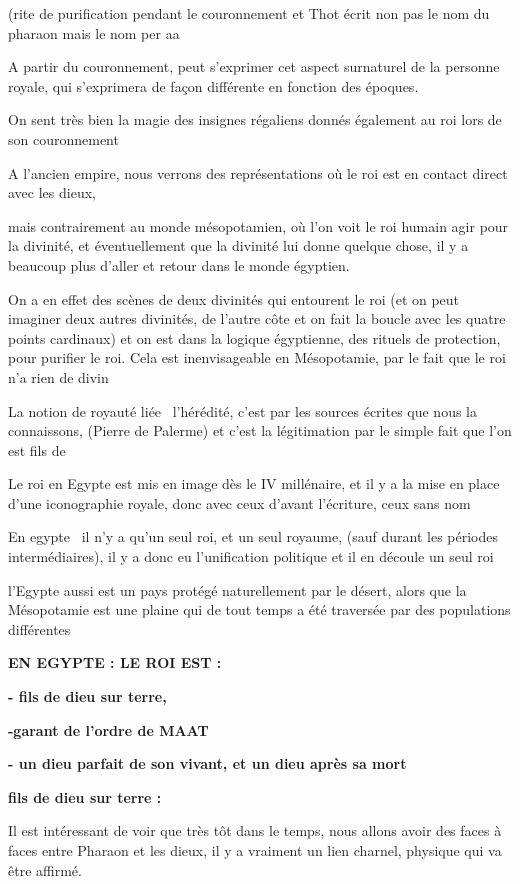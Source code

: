 \documentclass[a4paper]{article}
\begin{document}
(rite de purification pendant le couronnement et Thot écrit non pas le nom du pharaon mais le nom per aa


A partir du couronnement, peut s'exprimer cet aspect surnaturel de la personne royale, qui s'exprimera de façon
différente en fonction des époques. 


On sent très bien la magie des insignes régaliens donnés également au roi lors de son couronnement


A l'ancien empire, nous verrons des représentations où le roi est en contact direct avec les dieux, 

mais contrairement au monde mésopotamien, où l'on voit le roi humain agir pour la divinité, et éventuellement que la
divinité lui donne quelque chose, il y a beaucoup plus d'aller et retour dans le monde égyptien.

On a en effet des scènes de deux divinités qui entourent le roi (et on peut imaginer deux autres divinités, de l'autre
côte et on fait la boucle avec les quatre points cardinaux) et on est dans la logique égyptienne, des rituels de
protection, pour purifier le roi. Cela est inenvisageable en Mésopotamie, par le fait que le roi n'a rien de divin


La notion de royauté liée \ l'hérédité, c'est par les sources écrites que nous la connaissons, (Pierre de Palerme) et
c'est la légitimation par le simple fait que l'on est fils de


Le roi en Egypte est mis en image dès le IV millénaire, et il y a la mise en place d'une iconographie royale, donc avec
ceux d'avant l'écriture, ceux sans nom


En egypte \ il n'y a qu'un seul roi, et un seul royaume, (sauf durant les périodes intermédiaires), il y a donc eu
l'unification politique et il en découle un seul roi

l'Egypte aussi est un pays protégé naturellement par le désert, alors que la Mésopotamie est une plaine qui de tout
temps a été traversée par des populations différentes


\textbf{EN EGYPTE : LE ROI EST :}


\textbf{- fils de dieu sur terre,}

\textbf{-garant de l'ordre de MAAT}

\textbf{- un dieu parfait de son vivant, et un dieu après sa mort}


\textbf{fils de dieu sur terre :}


Il est intéressant de voir que très tôt dans le temps, nous allons avoir des faces à faces entre Pharaon et les dieux,
il y a vraiment un lien charnel, physique qui va être affirmé.
\end{document}
